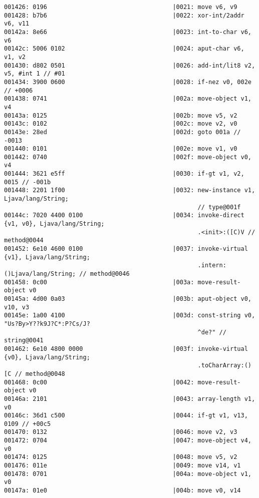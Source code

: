 \begin{lstlisting}
001426: 0196                                   |0021: move v6, v9
001428: b7b6                                   |0022: xor-int/2addr v6, v11
00142a: 8e66                                   |0023: int-to-char v6, v6
00142c: 5006 0102                              |0024: aput-char v6, v1, v2
001430: d802 0501                              |0026: add-int/lit8 v2, v5, #int 1 // #01
001434: 3900 0600                              |0028: if-nez v0, 002e // +0006
001438: 0741                                   |002a: move-object v1, v4
00143a: 0125                                   |002b: move v5, v2
00143c: 0102                                   |002c: move v2, v0
00143e: 28ed                                   |002d: goto 001a // -0013
001440: 0101                                   |002e: move v1, v0
001442: 0740                                   |002f: move-object v0, v4
001444: 3621 e5ff                              |0030: if-gt v1, v2, 0015 // -001b
001448: 2201 1f00                              |0032: new-instance v1, Ljava/lang/String;
                                                      // type@001f
00144c: 7020 4400 0100                         |0034: invoke-direct {v1, v0}, Ljava/lang/String;
                                                      .<init>:([C)V // method@0044
001452: 6e10 4600 0100                         |0037: invoke-virtual {v1}, Ljava/lang/String;
                                                      .intern:()Ljava/lang/String; // method@0046
001458: 0c00                                   |003a: move-result-object v0
00145a: 4d00 0a03                              |003b: aput-object v0, v10, v3
00145e: 1a00 4100                              |003d: const-string v0, "Us?By>Y??k9J?C*:P?Cs/J?
                                                      ^de?" // string@0041
001462: 6e10 4800 0000                         |003f: invoke-virtual {v0}, Ljava/lang/String;
                                                      .toCharArray:()[C // method@0048
001468: 0c00                                   |0042: move-result-object v0
00146a: 2101                                   |0043: array-length v1, v0
00146c: 36d1 c500                              |0044: if-gt v1, v13, 0109 // +00c5
001470: 0132                                   |0046: move v2, v3
001472: 0704                                   |0047: move-object v4, v0
001474: 0125                                   |0048: move v5, v2
001476: 011e                                   |0049: move v14, v1
001478: 0701                                   |004a: move-object v1, v0
00147a: 01e0                                   |004b: move v0, v14

\end{lstlisting}
